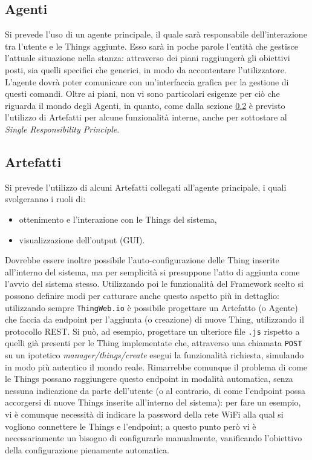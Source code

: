 \documentclass[12pt,a4paper,openright,oneside]{report}
\begin{document}
\subsection{Agenti}
Si prevede l'uso di un agente principale, il quale sarà responsabile dell'interazione tra l'utente e le Things aggiunte. Esso sarà in poche parole l'entità che gestisce l'attuale situazione nella stanza: attraverso dei piani raggiungerà gli obiettivi posti, sia quelli specifici che generici, in modo da accontentare l'utilizzatore. L'agente dovrà poter comunicare con un'interfaccia grafica per la gestione di questi comandi. Oltre ai piani, non vi sono particolari esigenze per ciò che riguarda il mondo degli Agenti, in quanto, come dalla sezione \ref{sec:artifacts} è previsto l'utilizzo di Artefatti per alcune funzionalità interne, anche per sottostare al \textit{Single Responsibility Principle}.

\subsection{Artefatti}
\label{sec:artifacts}
Si prevede l'utilizzo di alcuni Artefatti collegati all'agente principale, i quali svolgeranno i ruoli di:

\begin{itemize}
	\setlength\itemsep{-0.3em}
	\item ottenimento e l'interazione con le Things del sistema,
	\item visualizzazione dell'output (GUI).
\end{itemize}

Dovrebbe essere inoltre possibile l'auto-configurazione delle Thing inserite all'interno del sistema, ma per semplicità si presuppone l'atto di aggiunta come l'avvio del sistema stesso. Utilizzando poi le funzionalità del Framework scelto si possono definire modi per catturare anche questo aspetto più in dettaglio: utilizzando sempre \texttt{ThingWeb.io} è possibile progettare un Artefatto (o Agente) che faccia da endpoint per l'aggiunta (o creazione) di nuove Thing, utilizzando il protocollo REST. Si può, ad esempio, progettare un ulteriore file \texttt{.js} rispetto a quelli già presenti per le Thing implementate che, attraverso una chiamata \texttt{POST} su un ipotetico \textit{manager/things/create} esegui la funzionalità richiesta, simulando in modo più autentico il mondo reale. Rimarrebbe comunque il problema di come le Things possano raggiungere questo endpoint in modalità automatica, senza nessuna indicazione da parte dell'utente (o al contrario, di come l'endpoint possa accorgersi di nuove Things inserite all'interno del sistema): per fare un esempio, vi è comunque necessità di indicare la password della rete WiFi alla qual si vogliono connettere le Things e l'endpoint; a questo punto però vi è necessariamente un bisogno di configurarle manualmente, vanificando l'obiettivo della configurazione pienamente automatica.\\
\end{document}
